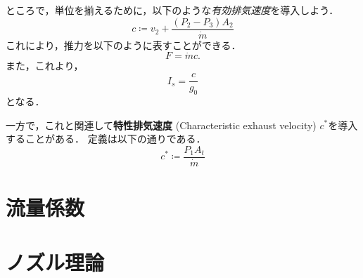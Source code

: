 \documentclass[uplatex,dvipdfmx,a4j,11pt]{jsreport}
\newcommand{\keyword}[1]{\textcolor{mainblue}{\textbf{#1}}}
\numberwithin{equation}{chapter}
\begin{document}
ところで，単位を揃えるために，以下のような\emph{有効排気速度}を導入しよう．
\begin{equation}
  c \coloneqq v_2 + \frac{(P_2 - P_3) A_2}{\dot{m}}
\end{equation}
これにより，推力を以下のように表すことができる．
\begin{equation}
  F = \dot{m} c.
\end{equation}
また，これより，
\begin{equation}
  I_s = \frac{c}{g_0}
\end{equation}
となる．

一方で，これと関連して\keyword{特性排気速度} (Characteristic exhaust velocity) $c^*$を導入することがある．
定義は以下の通りである．
\begin{equation}
  c^* \coloneqq \frac{P_1 A_t}{\dot{m}}
\end{equation}



\section{流量係数}
\section{ノズル理論}




\end{document}
